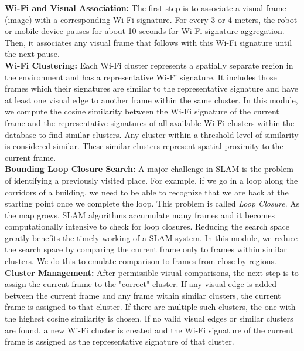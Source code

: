 \textbf{Wi-Fi and Visual Association:} The first step is to associate a visual frame (image) with a corresponding Wi-Fi signature. For every 3 or 4 meters, the robot or mobile device pauses for about 10 seconds for Wi-Fi signature aggregation. Then, it associates any visual frame that follows with this Wi-Fi signature until the next pause.\\
\textbf{Wi-Fi Clustering:} Each Wi-Fi cluster represents a spatially separate region in the environment and has a representative Wi-Fi signature. 
It includes those frames which their signatures are similar to the representative signature and have at least one visual edge to another frame within the same cluster.  In this module, we compute the cosine similarity between the Wi-Fi signature of the current frame and the representative signatures of all available Wi-Fi clusters within the database to find {similar clusters}. Any cluster within a threshold level of similarity is considered similar. These {similar clusters} represent spatial proximity to the current frame.\\
\textbf{Bounding Loop Closure Search:} A major challenge in SLAM is the problem of identifying a previously visited place. For example, if we go in a loop along the corridors of a building, we need to be able to recognize that we are back at the starting point once we complete the loop. This problem is called {\it Loop Closure}. As the map grows, SLAM algorithms accumulate many frames and it becomes computationally intensive to check for loop closures. Reducing the search space greatly benefits the timely working of a SLAM system. In this module, we reduce the search space by comparing the current frame only to frames within {similar clusters}. We do this to emulate comparison to frames from close-by regions.\\
\textbf{Cluster Management:} After permissible visual comparisons, the next step is to assign the current frame to the "correct" cluster. If any visual edge is added between the current frame and any frame within {similar clusters}, the current frame is assigned to that cluster. If there are multiple such clusters, the one with the highest cosine similarity is chosen. If no valid visual edges or {similar clusters} are found, a new Wi-Fi cluster is created and the Wi-Fi signature of the current frame is assigned as the representative signature of that cluster.

